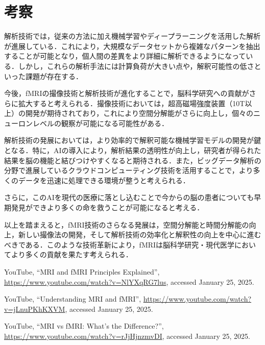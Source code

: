 \documentclass{jlreq}
\begin{document}
\section{考察}
解析技術では，従来の方法に加え機械学習やディープラーニングを活用した解析が進展している．これにより，大規模なデータセットから複雑なパターンを抽出することが可能となり，個人間の差異をより詳細に解析できるようになっている．しかし，これらの解析手法には計算負荷が大きい点や，解釈可能性の低さといった課題が存在する．

今後，fMRIの撮像技術と解析技術が進化することで，脳科学研究への貢献がさらに拡大すると考えられる．撮像技術においては，超高磁場強度装置（10T以上）の開発が期待されており，これにより空間分解能がさらに向上し，個々のニューロンレベルの観察が可能になる可能性がある．

解析技術の発展においては，より効率的で解釈可能な機械学習モデルの開発が鍵となる．特に，AIの導入により，解析結果の透明性が向上し，研究者が得られた結果を脳の機能と結びつけやすくなると期待される．また，ビッグデータ解析の分野で進展しているクラウドコンピューティング技術を活用することで，より多くのデータを迅速に処理できる環境が整うと考えられる．

さらに，このAIを現代の医療に落とし込むことで今からの脳の患者についても早期発見ができより多くの命を救うことが可能になると考える．

以上を踏まえると，fMRI技術のさらなる発展は，空間分解能と時間分解能の向上，新しい撮像法の開発，そして解析技術の効率化と解釈性の向上を中心に進むべきである．このような技術革新により，fMRIは脳科学研究・現代医学においてより多くの貢献を果たす考えられる．

\begin{thebibliography}{9}

YouTube, ``MRI and fMRI Principles Explained'', \url{https://www.youtube.com/watch?v=NlYXqRG7lus}, accessed January 25, 2025.

YouTube, ``Understanding MRI and fMRI'', \url{https://www.youtube.com/watch?v=jLnuPKhKXVM}, accessed January 25, 2025.

YouTube, ``MRI vs fMRI: What's the Difference?'', \url{https://www.youtube.com/watch?v=rJjHjnzmvDI}, accessed January 25, 2025.

\end{thebibliography}
\end{document}
